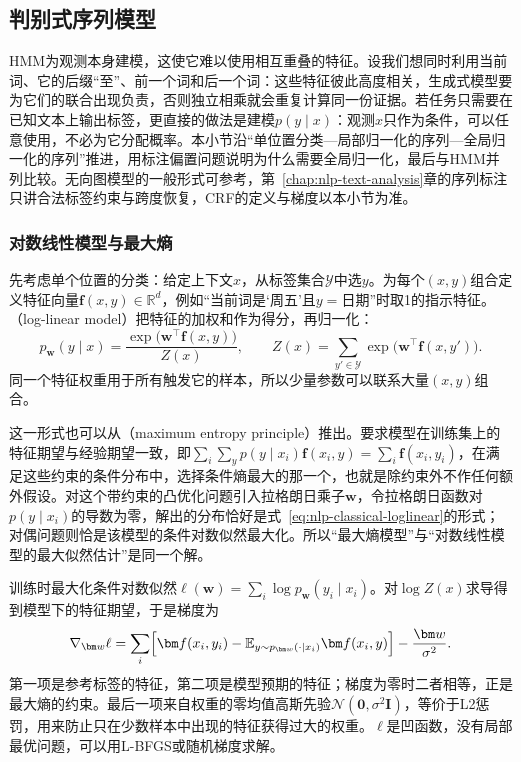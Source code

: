\subsection{判别式序列模型}
\label{sec:nlp-classical-discriminative}

HMM为观测本身建模，这使它难以使用相互重叠的特征。设我们想同时利用当前词、它的后缀“至”、前一个词和后一个词：这些特征彼此高度相关，生成式模型要为它们的联合出现负责，否则独立相乘就会重复计算同一份证据。若任务只需要在已知文本上输出标签，更直接的做法是建模$p(y\mid x)$：观测$x$只作为条件，可以任意使用，不必为它分配概率。本小节沿“单位置分类—局部归一化的序列—全局归一化的序列”推进，用标注偏置问题说明为什么需要全局归一化，最后与HMM并列比较。无向图模型的一般形式可参考，第~\ref{chap:nlp-text-analysis}章的序列标注只讲合法标签约束与跨度恢复，CRF的定义与梯度以本小节为准。

\subsubsection{对数线性模型与最大熵}
\label{sec:nlp-classical-maxent}

先考虑单个位置的分类：给定上下文$x$，从标签集合$\mathcal Y$中选$y$。为每个$(x,y)$组合定义特征向量$\bm f(x,y)\in\mathbb R^d$，例如“当前词是‘周五’且$y=$日期”时取1的指示特征。（log-linear model）把特征的加权和作为得分，再归一化：
\begin{equation}
  p_{\bm w}(y\mid x)=\frac{\exp\bigl(\bm w^{\top}\bm f(x,y)\bigr)}{Z(x)},\qquad
  Z(x)=\sum_{y'\in\mathcal Y}\exp\bigl(\bm w^{\top}\bm f(x,y')\bigr).
  \label{eq:nlp-classical-loglinear}
\end{equation}
同一个特征权重用于所有触发它的样本，所以少量参数可以联系大量$(x,y)$组合。

这一形式也可以从（maximum entropy principle）推出。要求模型在训练集上的特征期望与经验期望一致，即$\sum_i\sum_y p(y\mid x_i)\bm f(x_i,y)=\sum_i\bm f(x_i,y_i)$，在满足这些约束的条件分布中，选择条件熵最大的那一个，也就是除约束外不作任何额外假设。对这个带约束的凸优化问题引入拉格朗日乘子$\bm w$，令拉格朗日函数对$p(y\mid x_i)$的导数为零，解出的分布恰好是式~\eqref{eq:nlp-classical-loglinear}的形式；对偶问题则恰是该模型的条件对数似然最大化。所以“最大熵模型”与“对数线性模型的最大似然估计”是同一个解。

训练时最大化条件对数似然$\ell(\bm w)=\sum_i\log p_{\bm w}(y_i\mid x_i)$。对$\log Z(x)$求导得到模型下的特征期望，于是梯度为
\begin{equation}
  \nabla_{\bm w}\ell=\sum_i\Bigl[\bm f(x_i,y_i)-\mathbb E_{y\sim p_{\bm w}(\cdot\mid x_i)}\bm f(x_i,y)\Bigr]-\frac{\bm w}{\sigma^2}.
  \label{eq:nlp-classical-maxent-gradient}
\end{equation}
第一项是参考标签的特征，第二项是模型预期的特征；梯度为零时二者相等，正是最大熵的约束。最后一项来自权重的零均值高斯先验$\mathcal N(\bm0,\sigma^2\bm I)$，等价于L2惩罚，用来防止只在少数样本中出现的特征获得过大的权重。$\ell$是凹函数，没有局部最优问题，可以用L-BFGS或随机梯度求解。


